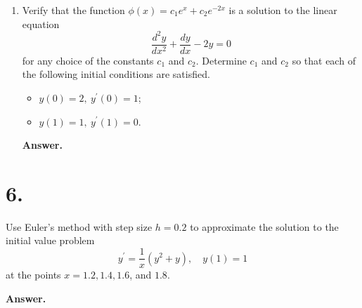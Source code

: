 \documentclass[11pt]{article}
\newenvironment{Question}{%
  \par\noindent\textbf{Answer.}\quad\ignorespaces
}{%
  \par\medskip
}
\begin{document}
\begin{enumerate}
  \item[22.] Verify that the function $\phi(x)=c_{1}e^{x}+c_{2}e^{-2x}$ is a solution to the linear equation
  $$\frac{d^{2}y}{dx^{2}}+\frac{dy}{dx}-2y=0$$
  for any choice of the constants $c_{1}$ and $c_{2}$. Determine $c_{1}$ and $c_{2}$ so that each of the following initial conditions are satisfied.
  \begin{itemize}
      \item[(a)] $y(0)=2,\ y^{\prime}(0)=1$;
      \item[(b)] $y(1)=1,\ y^{\prime}(1)=0$.
  \end{itemize}
  \begin{Question}
  \end{Question}
\end{enumerate}

\section*{6.}
Use Euler's method with step size $h=0.2$ to approximate the solution to the initial value problem
$$y^{\prime}=\frac{1}{x}\left(y^{2}+y\right),\quad y(1)=1$$
at the points $x=1.2, 1.4, 1.6$, and $1.8$.
\begin{Question}
\end{Question}
\end{document}
